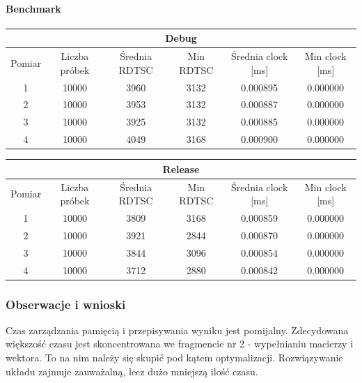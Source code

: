 \documentclass{article}
\begin{document}
	\paragraph{Benchmark}
	\begin{center}
		\begin{tabular}{|c|c|c|c|c|c|} \hline
			\multicolumn{6}{|c|}{Debug} \\\hline
			Pomiar  & Liczba próbek & Średnia RDTSC & Min RDTSC & Średnia clock [ms] & Min clock [ms] \\\hline
			\hline
			1 & 10000 & 3960 & 3132 & 0.000895 & 0.000000 \\\hline
			2 & 10000 & 3953 & 3132 & 0.000887 & 0.000000 \\\hline
			3 & 10000 & 3925 & 3132 & 0.000885 & 0.000000 \\\hline
			4 & 10000 & 4049 & 3168 & 0.000900 & 0.000000 \\\hline
			
		\end{tabular}
	\end{center}
	\begin{center}
		\begin{tabular}{|c|c|c|c|c|c|} \hline
			\multicolumn{6}{|c|}{Release} \\\hline
			Pomiar  & Liczba próbek & Średnia RDTSC & Min RDTSC & Średnia clock [ms] & Min clock [ms] \\\hline
			\hline
			1 & 10000 & 3809 & 3168 & 0.000859 & 0.000000 \\\hline
			2 & 10000 & 3921 & 2844 & 0.000870 & 0.000000 \\\hline
			3 & 10000 & 3844 & 3096 & 0.000854 & 0.000000 \\\hline
			4 & 10000 & 3712 & 2880 & 0.000842 & 0.000000 \\\hline
			
		\end{tabular}
	\end{center}
	
	\subsubsection{Obserwacje i wnioski}
	Czas zarządzania pamięcią i przepisywania wyniku jest pomijalny.
	Zdecydowana większość czasu jest skoncentrowana we fragmencie nr 2 - wypełnianiu macierzy i wektora. To na nim należy się skupić pod kątem optymalizacji.
	Rozwiązywanie układu zajmuje zauważalną, lecz dużo mniejszą ilość czasu.
	
	
	\pagebreak
\end{document}
